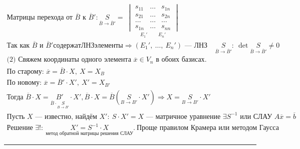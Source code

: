 \documentclass{article}
\begin{document}
\begin{gather*}
    \text{Матрицы перехода от } \overline{B} \text{ к } \overline{B}':
    \underset{\overline{B} \rightarrow \overline{B}'}{S} = ~\underset{E_1' ~~~~~~~~~~ E_n'}{\begin{vmatrix}
        s_{11} & \dots & s_{1n} \\
        s_{21} & \dots & s_{2n} \\
        \dots  & \dots & \dots  \\
        s_{1n} & \dots & s_{nn}
    \end{vmatrix}} \\
    \text{Так как } \overline{B} \text{ и } \overline{B}' содержат ЛНЗ элементы \Rightarrow
    \left( E_1', ~\dots, ~E_n' \right) \text{ --- ЛНЗ} ~~~~~
    \underset{\overline{B} \rightarrow \overline{B}'}{S}: ~ \boxed{\det \underset{\overline{B} \rightarrow \overline{B}'}{S} \neq 0}
\end{gather*}
\begin{gather*}
    \text{(2) Свяжем координаты одного элемента } \overline{x} \in V_n \text{ в обоих базисах}. \\
    \text{По старому: } \overline{x} = \overline{B}  \cdot X,  ~X  = X_B    \\
    \text{По новому: }  \overline{x} = \overline{B}' \cdot X', ~X' = X_{B'} \\
    \text{Тогда } \overline{B} \cdot X = \underset{\overline{B} \cdot \underset{B \to B'}{S}}{B'} \cdot X', 
    \overline{B} \cdot X = \overline{B} (\underset{B \to B'}{S} \cdot X') \Rightarrow \boxed{X = \underset{B \to B'}{S} \cdot X'} \\
    \text{Пусть } X \text{ --- известно, найдём } X': ~
    S \cdot X' = X \text{ --- матричное уравнение } \exists S^{-1} \text{ или СЛАУ } A \overline{x} = \overline{b} \\
    \text{Решение } \exists!: ~\underset{\text{метод обратной матрицы решения СЛАУ}}{\boxed{X' = S^{-1} \cdot X}}. ~
    \text{Проще правилом Крамера или методом Гаусса }
\end{gather*}



\par\noindent\rule{\textwidth}{1pt}
\end{document}
